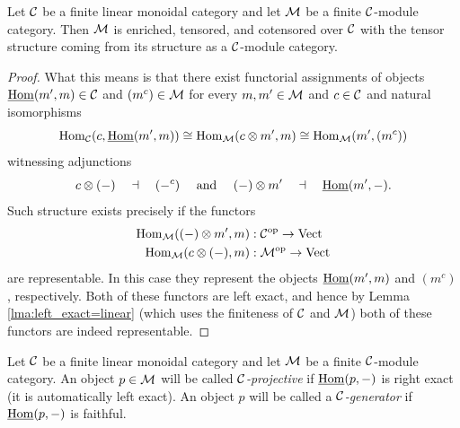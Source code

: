 \documentclass{amsart}
\begin{document}


\begin{theorem} \label{thm:enrichment-of-mod-cats}
	Let $\mathcal C$ be a finite linear monoidal category and let $\mathcal M$ be a finite $\mathcal C$-module category. Then $\mathcal M$ is enriched, tensored, and cotensored over $\mathcal C$ with the tensor structure coming from its structure as a $\mathcal C$-module category.
\end{theorem}

\begin{proof}
	What this means is that there exist functorial assignments of objects $\operatorname{\underline{Hom}}(m', m) \in \mathcal C$ and $(m^c) \in \mathcal M$ for every $m,m' \in \mathcal M$ and $c \in \mathcal C$ and natural isomorphisms
	\begin{equation*}
		\operatorname{Hom}_\mathcal C(c, \operatorname{\underline{Hom}}(m', m)) \cong \operatorname{Hom}_\mathcal M(c \otimes m', m) \cong \operatorname{Hom}_\mathcal M( m', (m^c))
	\end{equation*}
	witnessing adjunctions
	\begin{equation*}
			c \otimes (-) \quad \dashv\quad (-^c) \quad \textrm{ and } \quad (-) \otimes m' \quad \dashv \quad \operatorname{\underline{Hom}}(m', -).
	\end{equation*}
Such structure exists precisely if the functors
\begin{align*}
	\operatorname{Hom}_\mathcal M((-)\otimes m', m): \; & \mathcal C^{\mathrm{op}} \to \mathrm{Vect} \\
	\operatorname{Hom}_\mathcal M(c \otimes (-), m): \; & \mathcal M^{\mathrm{op}} \to \mathrm{Vect}
\end{align*}
are representable. In this case they represent the objects $\operatorname{\underline{Hom}}(m', m)$ and $(m^c)$, respectively. Both of these functors are left exact, and hence by Lemma \ref{lma:left_exact=linear} (which uses the finiteness of $\mathcal C$ and $\mathcal M$) both of these functors are indeed representable. 
\end{proof}

\begin{definition}
	Let $\mathcal C$ be a finite linear monoidal category and let $\mathcal M$ be a finite $\mathcal C$-module category. An object $p \in \mathcal M$ will be called {\em $\mathcal C$-projective} if $\operatorname{\underline{Hom}}(p, -)$ is right exact (it is automatically left exact). An object $p$ will be called a {\em $\mathcal C$-generator} if $\operatorname{\underline{Hom}}(p,-)$ is faithful. %
\end{definition}
\end{document}
